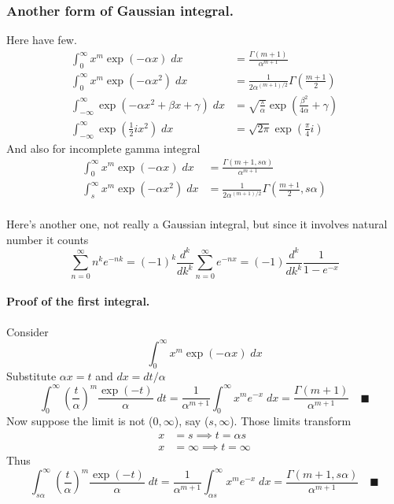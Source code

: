 \documentclass[../../main.tex]{subfiles}
\begin{document}
\subsubsection{Another form of Gaussian integral.} Here have few.
\begin{align*}
    \int_{0}^{\infty} x^m\exp (-\alpha x)\;dx &= \frac{\Gamma (m+1)}{\alpha^{m+1}}\\
    \int_{0}^{\infty}x^m \exp\left(-\alpha x^2\right)\; dx&=\frac{1}{2\alpha^{(m+1)/2} }\Gamma\left(\frac{m+1}{2}\right)\\
    \int_{-\infty}^{\infty}\exp \left( -\alpha x^2+\beta x+\gamma\right)\;dx&= \sqrt{\frac{\pi}{\alpha}} \exp \left(\frac{\beta^2}{4\alpha}+\gamma\right)\\
    \int_{-\infty}^{\infty}\exp \left(\frac{1}{2}ix^2\right)\;dx& = \sqrt{2\pi}\exp \left(\frac{\pi}{4}i\right) 
\end{align*}
And also for incomplete gamma integral
\begin{align*}
    \int_{0}^{\infty} x^m\exp (-\alpha x)\;dx &= \frac{\Gamma (m+1,s\alpha)}{\alpha^{m+1}}\\
    \int_{s}^{\infty}x^m \exp\left(-\alpha x^2\right)\; dx&=\frac{1}{2\alpha^{(m+1)/2} }\Gamma\left(\frac{m+1}{2},s\alpha\right)\\
\end{align*}

Here's another one, not really a Gaussian integral, but since it involves natural number it counts
\begin{equation*}
    \sum_{n=0}^{\infty}n^ke^{-nk}=(-1)^k\frac{d^k}{dk^k}\sum_{n=0}^{\infty}e^{-nx}=(-1)\frac{d^k}{dk^k}\frac{1}{1-e^{-x}}
\end{equation*}

\paragraph{Proof of the first integral.} Consider
\begin{equation*}
    \int_{0}^{\infty} x^m\exp (-\alpha x)\;dx
\end{equation*}
Substitute $\alpha x=t$ and $dx=dt/\alpha$
\begin{equation*}
    \int_{0}^{\infty} \left(\frac{t}{\alpha}\right)^m \frac{\exp(-t)}{\alpha}\;dt=\frac{1}{\alpha^{m+1}}\int_{0}^{\infty} x^{m}e^{-  x}\;dx=\frac{\Gamma (m+1)}{\alpha^{m+1}}\quad\blacksquare
\end{equation*}
Now suppose the limit is not ($0,\infty$), say  ($s,\infty$). Those limits transform
\begin{align*}
    x&=s\implies t=\alpha s\\
    x&=\infty\implies t=\infty
\end{align*}
Thus
\begin{equation*}
    \int_{s\alpha }^{\infty} \left(\frac{t}{\alpha}\right)^m \frac{\exp(-t)}{\alpha}\;dt=\frac{1}{\alpha^{m+1}}\int_{\alpha s}^{\infty} x^{m}e^{-  x}\;dx=\frac{\Gamma (m+1, s\alpha )}{\alpha^{m+1}}\quad\blacksquare
\end{equation*}
\end{document}
